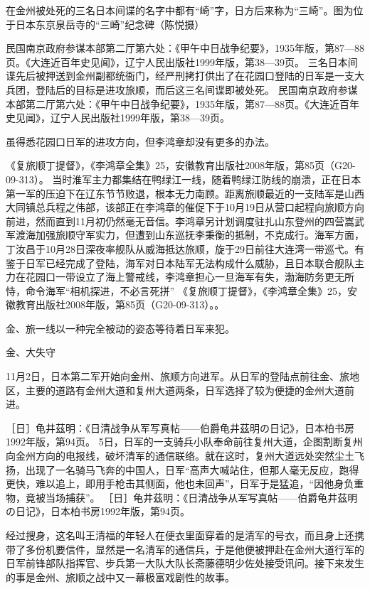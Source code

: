 \documentclass[12pt,UTF8]{ctexbook}
\begin{document}
在金州被处死的三名日本间谍的名字中都有“崎”字，日方后来称为“三崎”。图为位于日本东京泉岳寺的“三崎”纪念碑（陈悦摄）

民国南京政府参谋本部第二厅第六处：《甲午中日战争纪要》，1935年版，第87—88页。《大连近百年史见闻》，辽宁人民出版社1999年版，第38—39页。
三名日本间谍先后被押送到金州副都统衙门，经严刑拷打供出了在花园口登陆的日军是一支大兵团，登陆后的目标是进攻旅顺，而后这三名间谍即被处死。 民国南京政府参谋本部第二厅第六处：《甲午中日战争纪要》，1935年版，第87—88页。《大连近百年史见闻》，辽宁人民出版社1999年版，第38—39页。

虽得悉花园口日军的进攻方向，但李鸿章却没有更多的办法。

《复旅顺丁提督》，《李鸿章全集》25，安徽教育出版社2008年版，第85页（G20-09-313）。
当时淮军主力都集结在鸭绿江一线，随着鸭绿江防线的崩溃，正在日本第一军的压迫下在辽东节节败退，根本无力南顾。距离旅顺最近的一支陆军是山西大同镇总兵程之伟部，该部正在李鸿章的催促下于10月19日从营口起程向旅顺方向前进，然而直到11月初仍然毫无音信。李鸿章另计划调度驻扎山东登州的四营嵩武军渡海加强旅顺守军实力，但遭到山东巡抚李秉衡的抵制，不克成行。海军方面，丁汝昌于10月28日深夜率舰队从威海抵达旅顺，旋于29日前往大连湾一带巡弋。有鉴于日军已经完成了登陆，海军对日本陆军无法构成什么威胁，且日本联合舰队主力在花园口一带设立了海上警戒线，李鸿章担心一旦海军有失，渤海防务更无所恃，命令海军“相机探进，不必言死拼” 《复旅顺丁提督》，《李鸿章全集》25，安徽教育出版社2008年版，第85页（G20-09-313）。。

金、旅一线以一种完全被动的姿态等待着日军来犯。

金、大失守

11月2日，日本第二军开始向金州、旅顺方向进军。从日军的登陆点前往金、旅地区，主要的道路有金州大道和复州大道两条，日军选择了较为便捷的金州大道前进。

［日］龟井茲明：《日清战争从军写真帖——伯爵龟井茲明の日记》，日本柏书房1992年版，第94页。
5日，日军的一支骑兵小队奉命前往复州大道，企图割断复州向金州方向的电报线，破坏清军的通信联络。就在这时，复州大道远处突然尘土飞扬，出现了一名骑马飞奔的中国人，日军“高声大喊站住，但那人毫无反应，跑得更快，难以追上，即用手枪击其侧面，他也未回声”，日军于是猛追，“因他身负重物，竟被当场捕获”。 ［日］龟井茲明：《日清战争从军写真帖——伯爵龟井茲明の日记》，日本柏书房1992年版，第94页。

经过搜身，这名叫王清福的年轻人在便衣里面穿着的是清军的号衣，而且身上还携带了多份机要信件，显然是一名清军的通信兵，于是他便被押赴在金州大道行军的日军前锋部队指挥官、步兵第一大队大队长斋藤德明少佐处接受讯问。接下来发生的事是金州、旅顺之战中又一幕极富戏剧性的故事。
\end{document}
